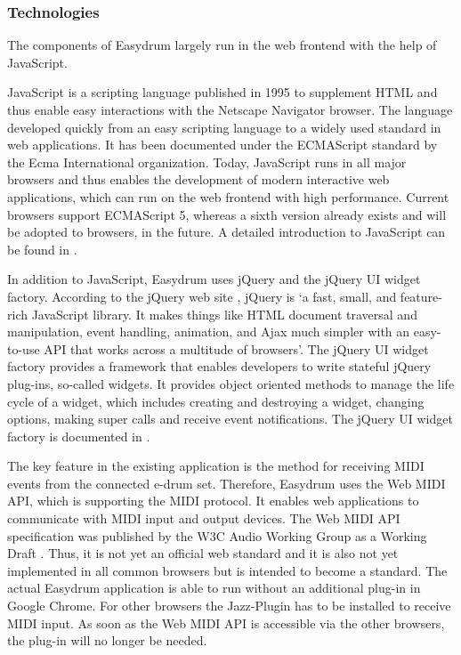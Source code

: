 \newpage
\newpage

\subsubsection{Technologies}
The components of Easydrum largely run in the web frontend with the help of JavaScript. 

JavaScript is a scripting language published in 1995 to supplement HTML and thus enable easy interactions with the Netscape Navigator browser. The language developed quickly from an easy scripting language to a widely used standard in web applications. It has been documented under the ECMAScript standard by the Ecma International organization. Today, JavaScript runs in all major browsers and thus enables the development of modern interactive web applications, which can run on the web frontend with high performance. Current browsers support ECMAScript 5, whereas a sixth version already exists and will be adopted to browsers, in the future. A detailed introduction to JavaScript can be found in \autocite{Haverbeke:2014}.

In addition to JavaScript, Easydrum uses jQuery and the jQuery UI widget factory. According to the jQuery web site \autocite{jQuery:2015}, jQuery is `a fast, small, and feature-rich JavaScript library. It makes things like HTML document traversal and manipulation, event handling, animation, and Ajax much simpler with an easy-to-use API that works across a multitude of browsers'. The jQuery UI widget factory provides a framework that enables developers to write stateful jQuery plug-ins, so-called widgets. It provides object oriented methods to manage the life cycle of a widget, which includes creating and destroying a widget, changing options, making super calls and receive event notifications. The jQuery UI widget factory is documented in \autocite{jQueryUI:2015}.

The key feature in the existing application is the method for receiving MIDI events from the connected e-drum set. Therefore, Easydrum uses the Web MIDI API, which is supporting the MIDI protocol. It enables web applications to communicate with MIDI input and output devices. The Web MIDI API specification was published by the W3C Audio Working Group as a Working Draft \autocite{WebMidiApi:2015}. Thus, it is not yet an official web standard and it is also not yet implemented in all common browsers but is intended to become a standard. The actual Easydrum application is able to run without an additional plug-in in Google Chrome. For other browsers the Jazz-Plugin \autocite{JazzPlugin:2015} has to be installed to receive MIDI input. As soon as the Web MIDI API is accessible via the other browsers, the plug-in will no longer be needed. 

